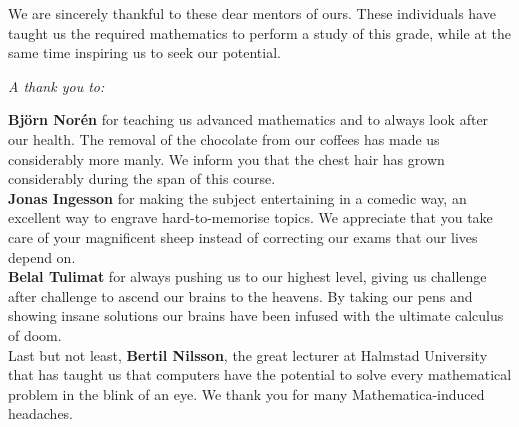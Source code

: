 \documentclass[main.tex]{subfiles}
\begin{document}
We are sincerely thankful to these dear mentors of ours. These individuals have
taught us the required mathematics to perform a study of this grade, while at
the same time inspiring us to seek our potential. \\

\begin{center}
  \emph{A thank you to:} \\
\end{center}

\textbf{Björn Norén} for teaching us advanced mathematics and to always look
after our health. The removal of the chocolate from our coffees has made us
considerably more manly. We inform you that the chest
hair has grown considerably during the span of this course. \\

\textbf{Jonas Ingesson} for making the subject entertaining in a comedic way, an
excellent way to engrave hard-to-memorise topics. We appreciate that you take
care of your magnificent sheep instead of correcting our exams
that our lives depend on. \\

\textbf{Belal Tulimat} for always pushing us to our highest level, giving us
challenge after challenge to ascend our brains to the heavens. By taking our
pens and showing insane solutions our brains have been infused with the ultimate
calculus of doom. \\

Last but not least, \textbf{Bertil Nilsson}, the great lecturer at Halmstad
University that has taught us that computers have the potential to solve
every mathematical problem in the blink of an eye. We thank you for many
Mathematica-induced headaches.\\
\end{document}
